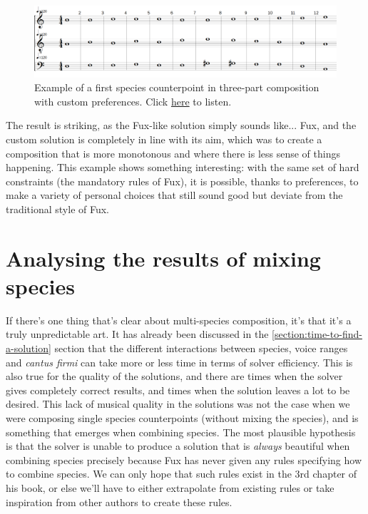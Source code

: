 \begin{figure}[h!]
    \centering
    \includegraphics[width=1\textwidth]{Images/Musicality/musicality-1sp-custom-pref.png}
    \caption{Example of a first species counterpoint in three-part composition with custom preferences. Click \href{https://youtu.be/aWmkHdcuook}{here} to listen.}
    \label{fig:musicality-1sp-custom}
\end{figure}

The result is striking, as the Fux-like solution simply sounds like... Fux, and the custom solution is completely in line with its aim, which was to create a composition that is more monotonous and where there is less sense of things happening. This example shows something interesting: with the same set of hard constraints (the mandatory rules of Fux), it is possible, thanks to preferences, to make a variety of personal choices that still sound good but deviate from the traditional style of Fux. 

\section{Analysing the results of mixing species}
If there's one thing that's clear about multi-species composition, it's that it's a truly unpredictable art. It has already been discussed in the \ref{section:time-to-find-a-solution} section that the different interactions between species, voice ranges and \textit{cantus firmi} can take more or less time in terms of solver efficiency. This is also true for the quality of the solutions, and there are times when the solver gives completely correct results, and times when the solution leaves a lot to be desired. This lack of musical quality in the solutions was not the case when we were composing single species counterpoints (without mixing the species), and is something that emerges when combining species. The most plausible hypothesis is that the solver is unable to produce a solution that is \textit{always} beautiful when combining species precisely because Fux has never given any rules specifying how to combine species. We can only hope that such rules exist in the 3rd chapter of his book, or else we'll have to either extrapolate from existing rules or take inspiration from other authors to create these rules.

